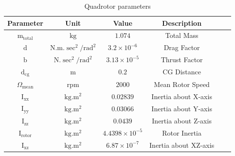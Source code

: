 \documentclass[3p]{elsarticle}
\begin{document}
\begin{table}[H]
    \centering
    \caption{Quadrotor parameters}
    \vspace{-0.5cm}
    \renewcommand{\arraystretch}{1.3}
    \begin{center}
    \begin{tabular}{cccccc}
    \hline
    Parameter & Unit & Value & Description \\
    \hline
    $\mathrm{m}_{\text{total}}$ & $\mathrm{kg}$ & $1.074$ & Total Mass \\ 
    $\mathrm{d}$ & $\mathrm{N.m.\sec^2/rad^2}$ & $3.2\times10^{-6}$ & Drag Factor \\
    $\mathrm{b}$ & $\mathrm{N.\sec^2/rad^2}$ & $3.13\times10^{-5}$ & Thrust Factor \\
    $\mathrm{d}_{\text{cg}}$ & $\mathrm{m}$ & $0.2$ & CG Distance \\
    $\Omega_{\text{mean}}$ & $\mathrm{rpm}$ & $2000$ & Mean Rotor Speed \\
    \hline
    $\mathrm{I}_{\text{xx}}$ & $\mathrm{kg.m^2}$ & $0.02839$ & Inertia about X-axis \\
    $\mathrm{I}_{\text{yy}}$ & $\mathrm{kg.m^2}$ & $0.03066$ & Inertia about Y-axis \\
    $\mathrm{I}_{\text{zz}}$ & $\mathrm{kg.m^2}$ & $0.0439$ & Inertia about Z-axis \\
    $\mathrm{I}_{\text{rotor}}$ & $\mathrm{kg.m^2}$ & $4.4398\times 10^{-5}$ & Rotor Inertia \\
    $\mathrm{I}_{\text{xz}}$ & $\mathrm{kg.m^2}$ & $6.87\times 10^{-7}$ & Inertia about XZ-axis \\
    \hline
\end{tabular}
\label{tab:parameters}
\end{center}
\end{table}
\end{document}
